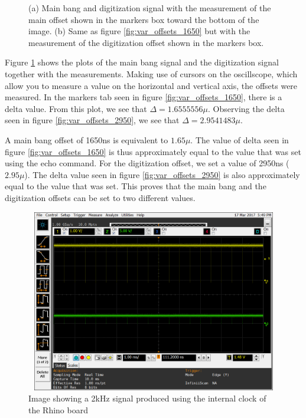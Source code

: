 \documentclass[12pt, a4paper]{article}
\begin{document}
\begin{figure}[t]
	\caption{(a) Main bang and digitization signal with the measurement of the main offset shown in the markers box toward the bottom of the image. (b) Same as figure \ref{fig:var_offsets_1650} but with the measurement of the digitization offset shown in the  markers box.}
	\label{fig:variable_offsets}
	\end{figure}

\clearpage
	
Figure \ref{fig:variable_offsets} shows the plots of the main bang signal and the digitization signal together with the measurements. Making use of cursors on the oscillscope, which allow you to measure a value on the horizontal and vertical axis, the offsets were measured. In the markers tab seen in figure \ref{fig:var_offsets_1650}, there is a delta value. From this plot, we see that \( \Delta = 1.6555556 \mu \). Observing the delta seen in figure \ref{fig:var_offsets_2950}, we see that \( \Delta = 2.9541483 \mu \). 


A main bang offset of 1650ns is equivalent to \( 1.65 \mu \). The value of delta seen in figure \ref{fig:var_offsets_1650} is thus approximately equal to the value that was set using the echo command. For the digitization offset, we set a value of 2950ns (\( 2.95 \mu \)). The delta value seen in figure \ref{fig:var_offsets_2950} is also approximately equal to the value that was set. This proves that the main bang and the digitization offsets can be set to two different values. 


	\begin{figure}[t]
		\centering
		\includegraphics[width=13cm, height=8cm]{2khz_mb_offset_500_ns}
		\caption{Image showing a 2kHz signal produced using the internal clock of the Rhino board}
		\label{fig:2kHz_sig_int}
	\end{figure}
	
\end{document}
